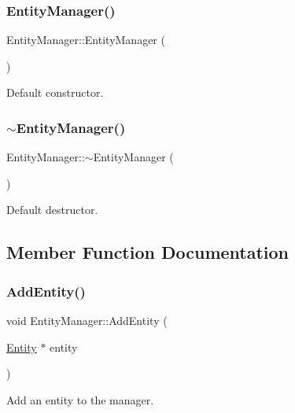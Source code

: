 \subsubsection{\texorpdfstring{Entity\+Manager()}{EntityManager()}}
{\footnotesize\ttfamily Entity\+Manager\+::\+Entity\+Manager (\begin{DoxyParamCaption}{ }\end{DoxyParamCaption})}

Default constructor. \mbox{\label{class_entity_manager_a71a36c9fb8d579a1a1ec108e0fccf175}} 
\subsubsection{\texorpdfstring{$\sim$\+Entity\+Manager()}{~EntityManager()}}
{\footnotesize\ttfamily Entity\+Manager\+::$\sim$\+Entity\+Manager (\begin{DoxyParamCaption}{ }\end{DoxyParamCaption})}

Default destructor. 

\subsection{Member Function Documentation}
\mbox{\label{class_entity_manager_a06dc55d7fe6da1f48ca2a9313c7060e7}} 
\subsubsection{\texorpdfstring{Add\+Entity()}{AddEntity()}}
{\footnotesize\ttfamily void Entity\+Manager\+::\+Add\+Entity (\begin{DoxyParamCaption}\item[{\mbox{\hyperlink{class_entity}{Entity}} $\ast$}]{entity }\end{DoxyParamCaption})}

Add an entity to the manager. \mbox{\label{class_entity_manager_acdea7d35f1b2d2df949f3360c30728ab}} 
